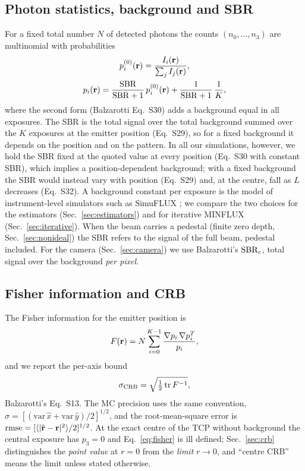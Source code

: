 \subsection{Photon statistics, background and SBR}
For a fixed total number $N$ of detected photons the counts $(n_0,\dots,n_3)$ are multinomial
with probabilities \cite{Balzarotti2017}
\begin{equation}
\begin{gathered}
p_i^{(0)}(\mathbf{r})=\frac{I_i(\mathbf{r})}{\sum_jI_j(\mathbf{r})},\\
p_i(\mathbf{r})=\frac{\mathrm{SBR}}{\mathrm{SBR}+1}\,p_i^{(0)}(\mathbf{r})+\frac{1}{\mathrm{SBR}+1}\,\frac1K,
\end{gathered}
\label{eq:p}
\end{equation}
where the second form (Balzarotti Eq.~S30) adds a background equal in all exposures. The SBR is
the total signal over the total background summed over the $K$ exposures at the emitter position
(Eq.~S29), so for a fixed background it depends on the position and on the pattern. In all our
simulations, however, we hold the SBR fixed at the quoted value at every position (Eq.~S30 with
constant SBR), which implies a position-dependent background; with a fixed background the SBR
would instead vary with position (Eq.~S29) and, at the centre, fall as $L$ decreases (Eq.~S32).
A background constant per exposure is the model of instrument-level simulators such as
SimuFLUX \cite{MarinRies2026}; we compare the two choices for the estimators
(Sec.~\ref{sec:estimators}) and for iterative MINFLUX (Sec.~\ref{sec:iterative}). When the beam carries a pedestal
(finite zero depth, Sec.~\ref{sec:nonideal}) the SBR refers to the signal of the full beam,
pedestal included. For the camera (Sec.~\ref{sec:camera}) we use Balzarotti's $\mathrm{SBR}_c$, total
signal over the background \emph{per pixel}.

\subsection{Fisher information and CRB}
The Fisher information for the emitter position is
\begin{equation}
F(\mathbf{r})=N\sum_{i=0}^{K-1}\frac{\nabla p_i\,\nabla p_i^{T}}{p_i},
\label{eq:fisher}
\end{equation}
and we report the per-axis bound
\begin{equation}
\sigma_{\mathrm{CRB}}=\sqrt{\tfrac12\,\mathrm{tr}\,F^{-1}},
\label{eq:crb}
\end{equation}
Balzarotti's Eq.~S13. The MC precision uses the same convention,
$\sigma=[(\mathrm{var}\,\hat x+\mathrm{var}\,\hat y)/2]^{1/2}$, and the root-mean-square error
is $\mathrm{rmse}=[\langle|\hat{\mathbf{r}}-\mathbf{r}|^2\rangle/2]^{1/2}$. At the exact centre of the TCP
without background the central exposure has $p_3=0$ and Eq.~\eqref{eq:fisher} is ill defined;
Sec.~\ref{sec:crb} distinguishes the \emph{point value} at $r=0$ from the \emph{limit}
$r\to0$, and ``centre CRB'' means the limit unless stated otherwise.

